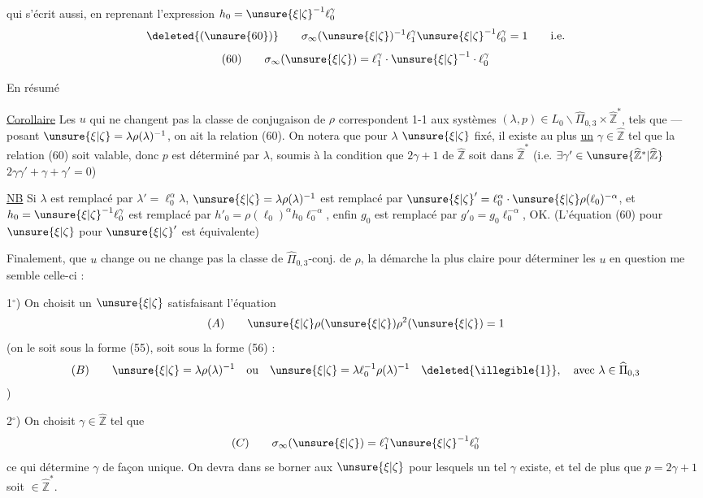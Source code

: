 qui s'écrit aussi, en reprenant l'expression $h_0=\unsure{\xi|\zeta}^{-1}\ell_0^\gamma$
\[
\deleted{(\unsure{60})}\qquad
\sigma_\infty(\unsure{\xi|\zeta})^{-1}\ell_1^\gamma\unsure{\xi|\zeta}^{-1}\ell_0^\gamma=1
\qquad\text{i.e.}
\]
\[
(60)\qquad \sigma_\infty(\unsure{\xi|\zeta})=\ell_1^\gamma\cdot\unsure{\xi|\zeta}^{-1}\cdot\ell_0^\gamma
\]

En résumé

\uline{Corollaire} Les $u$ qui ne changent pas la classe de conjugaison de $\rho$  correspondent 1-1 aux systèmes $(\lambda,p)\in L_0\backslash\widehat{\Pi}_{0,3}\times\widehat{\mathbb Z}^{*}$, tels que --- posant $\unsure{\xi|\zeta}=\lambda\rho(\lambda)^{-1}$,  on ait la relation (60).
On notera que pour $\lambda$  $\unsure{\xi|\zeta}$ fixé, il existe au plus \uline{un} $\gamma\in\widehat{\mathbb Z}$ tel que la relation (60) soit valable, donc $p$ est déterminé par $\lambda$, soumis à la condition  que  $2\gamma+1$ de $\widehat{\mathbb Z}$ soit dans $\widehat{\mathbb Z}^{*}$ (i.e. $\exists\gamma'\in\unsure{\widehat{\mathbb Z}^{*}|\widehat{\mathbb Z}}$  $2\gamma\gamma'+\gamma+\gamma'=0$)


\uline{NB} Si $\lambda$ est remplacé par $\lambda'=\ell_0^\alpha\lambda$, $\unsure{\xi|\zeta}=\lambda\rho(\lambda)^{-1}$ est remplacé par $\unsure{\xi|\zeta}'=\ell_0^\alpha\cdot\unsure{\xi|\zeta}\rho(\ell_0)^{-\alpha}$, et $h_0=\unsure{\xi|\zeta}^{-1}\ell_0^\gamma$ est remplacé par $h'_0=\rho(\ell_0)^\alpha h_0\ell_0^{-\alpha}$, enfin $g_0$ est remplacé par $g'_0=g_0\ell_0^{-\alpha}$, OK. \unsure{!} (L'équation (60) pour $\unsure{\xi|\zeta}$  pour $\unsure{\xi|\zeta}'$ est équivalente)

Finalement, que $u$ change ou ne change pas la classe de $\widehat{\Pi}_{0,3}$-conj. de $\rho$, la démarche la plus claire pour déterminer les $u$ en question me semble celle-ci :

1$^\circ$) On choisit un $\unsure{\xi|\zeta}$  satisfaisant l'équation
\[
(A)\qquad \unsure{\xi|\zeta}\rho(\unsure{\xi|\zeta})\rho^2(\unsure{\xi|\zeta})=1
\]
(on le  soit sous la forme (55), soit sous la forme (56)\deleted{\unsure{)}} :
\[
(B)\qquad
\unsure{\xi|\zeta}=\lambda\rho(\lambda)^{-1}
\quad\text{ou}\quad
\unsure{\xi|\zeta}=\lambda\ell_0^{-1}\rho(\lambda)^{-1}
\quad\deleted{\illegible{1}},\quad\text{avec }\lambda\in\widehat{\Pi}_{0,3}
\]
)

2$^\circ$) On choisit $\gamma\in\widehat{\mathbb Z}$ tel que
\[
(C)\qquad \sigma_\infty(\unsure{\xi|\zeta})=\ell_1^\gamma\unsure{\xi|\zeta}^{-1}\ell_0^\gamma
\]
ce qui détermine $\gamma$ de façon unique. On devra dans  se borner aux $\unsure{\xi|\zeta}$  pour lesquels un tel $\gamma$ existe, et tel de plus que $p=2\gamma+1$ soit $\in\widehat{\mathbb Z}^{*}$.
